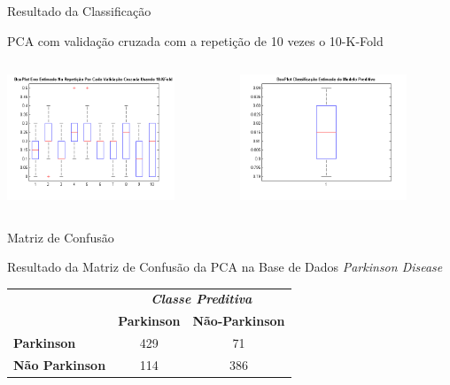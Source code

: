 \documentclass{beamer}
\begin{document}
\begin{frame}{Resultado da Classificação}
   \begin{block}{PCA com validação cruzada com a repetição de 10 vezes o 10-K-Fold}   
   \begin{columns}[c]
     \begin{column}{0.5\linewidth}
				\includegraphics[width=5cm]{img/boxplot-eigengaits-parkinsondatabase-error-kfold.png}
     \end{column}

     \begin{column}{0.5\linewidth}
				\includegraphics[width=5cm]{img/boxplot-eigengaits-parkinsondatabase.png}
    \end{column}
\end{columns}
\end{block}
\end{frame}

\begin{frame}{Matriz de Confusão}
	\begin{block}{Resultado da Matriz de Confusão da PCA na Base de Dados \textit{Parkinson Disease}}
\begin{table}[!htbp]
\label{table:resultadomatrizconfusaopca}
\centering
\begin{tabular}{l|c|c|}
\cline{2-3}
\multicolumn{1}{c}{}                         & \multicolumn{2}{|c|}{\textit{\textbf{Classe Preditiva}}} \\ \cline{2-3} 
                                             & \textbf{Parkinson}      & \textbf{Não-Parkinson}         \\ \hline
\multicolumn{1}{|l|}{\textbf{Parkinson}} & 429       & 71           \\ \hline
\multicolumn{1}{|l|}{\textbf{Não Parkinson}}     & 114           & 386     \\ \hline
\end{tabular}
\end{table}
	\end{block}
\end{frame}
\end{document}
